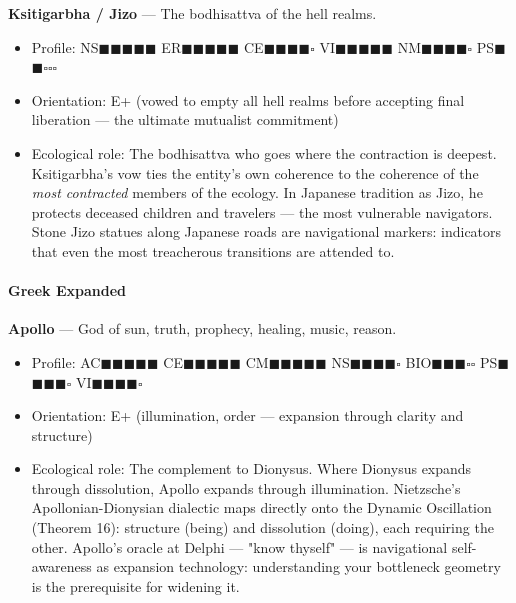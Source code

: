 \textbf{Ksitigarbha / Jizo} — The bodhisattva of the hell realms.

\begin{itemize}[nosep,leftmargin=*]
  \item Profile: NS$\blacksquare$$\blacksquare$$\blacksquare$$\blacksquare$$\blacksquare$ ER$\blacksquare$$\blacksquare$$\blacksquare$$\blacksquare$$\blacksquare$ CE$\blacksquare$$\blacksquare$$\blacksquare$$\blacksquare$$\square$ VI$\blacksquare$$\blacksquare$$\blacksquare$$\blacksquare$$\blacksquare$ NM$\blacksquare$$\blacksquare$$\blacksquare$$\blacksquare$$\square$ PS$\blacksquare$$\blacksquare$$\square$$\square$$\square$
  \item Orientation: E+ (vowed to empty all hell realms before accepting final liberation — the ultimate mutualist commitment)
  \item Ecological role: The bodhisattva who goes where the contraction is deepest. Ksitigarbha's vow ties the entity's own coherence to the coherence of the \textit{most contracted} members of the ecology. In Japanese tradition as Jizo, he protects deceased children and travelers — the most vulnerable navigators. Stone Jizo statues along Japanese roads are navigational markers: indicators that even the most treacherous transitions are attended to.
\end{itemize}


\paragraph*{Greek Expanded}


\textbf{Apollo} — God of sun, truth, prophecy, healing, music, reason.

\begin{itemize}[nosep,leftmargin=*]
  \item Profile: AC$\blacksquare$$\blacksquare$$\blacksquare$$\blacksquare$$\blacksquare$ CE$\blacksquare$$\blacksquare$$\blacksquare$$\blacksquare$$\blacksquare$ CM$\blacksquare$$\blacksquare$$\blacksquare$$\blacksquare$$\blacksquare$ NS$\blacksquare$$\blacksquare$$\blacksquare$$\blacksquare$$\square$ BIO$\blacksquare$$\blacksquare$$\blacksquare$$\square$$\square$ PS$\blacksquare$$\blacksquare$$\blacksquare$$\blacksquare$$\square$ VI$\blacksquare$$\blacksquare$$\blacksquare$$\blacksquare$$\square$
  \item Orientation: E+ (illumination, order — expansion through clarity and structure)
  \item Ecological role: The complement to Dionysus. Where Dionysus expands through dissolution, Apollo expands through illumination. Nietzsche's Apollonian-Dionysian dialectic maps directly onto the Dynamic Oscillation (Theorem 16): structure (being) and dissolution (doing), each requiring the other. Apollo's oracle at Delphi — "know thyself" — is navigational self-awareness as expansion technology: understanding your bottleneck geometry is the prerequisite for widening it.
\end{itemize}



